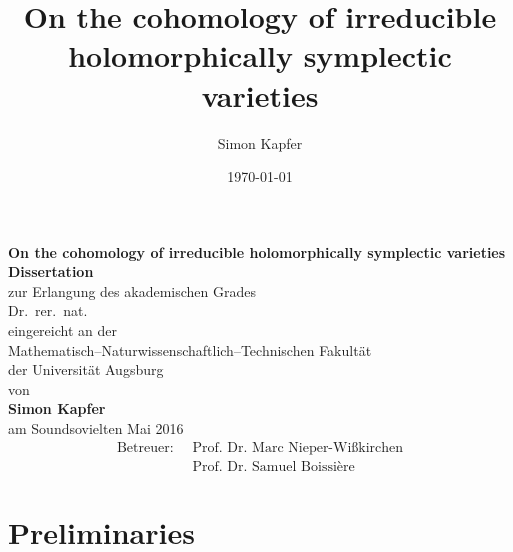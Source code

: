 \documentclass[a4paper]{article}
\begin{document}
\title{
\bf On the cohomology of irreducible holomorphically symplectic varieties
}


\author{Simon Kapfer}


\date{\today}
\thispagestyle{empty}
\begin{center}
\vspace{7cm}
\textbf{ \LARGE On the cohomology of irreducible holomorphically symplectic varieties}
\\
\vspace{1cm}
\Large \textbf{Dissertation} \\
\Large 
\vspace{0.5cm}
\textnormal\large zur Erlangung des akademischen Grades \\
\vspace{5mm}
Dr.~rer.~nat. \\
\vspace{1cm}
eingereicht an der \\
Mathematisch--Naturwissenschaftlich--Technischen Fakult\"at\\
der Universit\"at Augsburg
\\ \vspace{1cm}
von \\
\textbf{Simon Kapfer}\\
\vspace{8mm}
am Soundsovielten Mai 2016 \\
\vspace{2cm}
\begin{align*}
\text{Betreuer: }\ 
& \text{Prof.~Dr.~Marc Nieper-Wi\ss kirchen}\\
& \text{Prof.~Dr.~Samuel Boissi\`ere}
\end{align*}
\end{center}
\pagebreak

\tableofcontents

\pagebreak
{} 


\part{Preliminaries}





\end{document}
